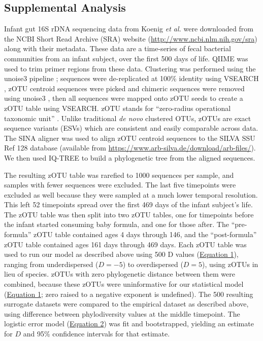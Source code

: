 \documentclass{article}
\begin{document}
\subsection{Supplemental Analysis} \label{sec:analysis_supp}
Infant gut 16S rDNA sequencing data from Koenig \emph{et al.} \cite{Koenig2011} were downloaded from the NCBI Short Read Archive (SRA) website (\url{http://www.ncbi.nlm.nih.gov/sra}) along with their metadata. These data are a time-series of fecal bacterial communities from an infant subject, over the first 500 days of life. QIIME \cite{Caporaso2010} was used to trim primer regions from these data. Clustering was performed using the unoise3 pipeline \cite{Edgar2016}; sequences were de-replicated at 100\% identity using VSEARCH \cite{Rognes2016}, zOTU centroid sequences were picked and chimeric sequences were removed using unoise3 \cite{Edgar2016}, then all sequences were mapped onto zOTU seeds to create a zOTU table using VSEARCH. zOTU stands for “zero-radius operational taxonomic unit” \cite{Edgar2016}. Unlike traditional \emph{de novo} clustered OTUs, zOTUs are exact sequence variants (ESVs) which are consistent and easily comparable across data. The SINA aligner \cite{Pruesse2012} was used to align zOTU centroid sequences to the SILVA SSU Ref 128 database (available from \url{https://www.arb-silva.de/download/arb-files/}). We then used IQ-TREE \cite{Nguyen2015} to build a phylogenetic tree from the aligned sequences.
\par
The resulting zOTU table was rarefied to 1000 sequences per sample, and samples with fewer sequences were excluded. The last five timepoints were excluded as well because they were sampled at a much lower temporal resolution. This left 52 timepoints spread over the first 469 days of the infant subject's life. The zOTU table was then split into two zOTU tables, one for timepoints before the infant started consuming baby formula, and one for those after. The “pre-formula” zOTU table contained ages 4 days through 146, and the “post-formula” zOTU table contained ages 161 days through 469 days. Each zOTU table was used to run our model as described above using 500 D values (\hyperref[sec:equation1]{Equation 1}), ranging from underdispersed (\(D = -5\)) to overdispersed (\(D = 5\)), using zOTUs in lieu of species. zOTUs with zero phylogenetic distance between them were combined, because these zOTUs were uninformative for our statistical model (\hyperref[sec:equation1]{Equation 1}; zero raised to a negative exponent is undefined). The 500 resulting surrogate datasets were compared to the empirical dataset as described above, using difference between phylodiversity values at the middle timepoint. The logistic error model (\hyperref[sec:equation2]{Equation 2}) was fit and bootstrapped, yielding an estimate for \(D\) and 95\% confidence intervals for that estimate.
\end{document}
